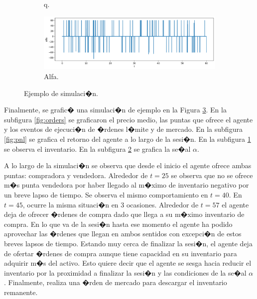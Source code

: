 \documentclass[12pt,a4paper,spanish]{article}%
\begin{document}
\begin{figure}[H]
\begin{subfigure}{0.8\textwidth}
	\caption{q.}
	\label{fig:q}
\end{subfigure}
\begin{subfigure}{0.8\textwidth}
	\centering
	\includegraphics[width=1\linewidth]{figuras/alpha_final}
	\caption{Alfa.}
	\label{fig:alpha}
\end{subfigure}
\caption{Ejemplo de simulaci�n.}
\label{fig:orders_pnl_q_alfa}
\end{figure}

Finalmente, se grafic� una simulaci�n de ejemplo en la Figura \ref{fig:orders_pnl_q_alfa}. En la subfigura \ref{fig:orders} se graficaron el precio medio, las puntas que ofrece el agente y los eventos de ejecuci�n de �rdenes l�mite y de mercado. En la subfigura \ref{fig:pnl} se grafica el retorno del agente a lo largo de la sesi�n. En la subfigura \ref{fig:q} se observa el inventario. En la subfigura \ref{fig:alpha} se grafica la se�al $\alpha$.

A lo largo de la simulaci�n se observa que desde el inicio el agente ofrece ambas puntas: compradora y vendedora. Alrededor de $t=25$ se observa que no se ofrece m�s punta vendedora por haber llegado al m�ximo de inventario negativo por un breve lapso de tiempo. Se observa el mismo comportamiento en $t=40$. En $t=45$, ocurre la misma situaci�n en 3 ocasiones. Alrededor de $t=57$ el agente deja de ofrecer �rdenes de compra dado que llega a su m�ximo inventario de compra. En lo que va de la sesi�n hasta ese momento el agente ha podido aprovechar las �rdenes que llegan en ambos sentidos con excepci�n de estos breves lapsos de tiempo. Estando muy cerca de finalizar la sesi�n, el agente deja de ofertar �rdenes de compra aunque tiene capacidad en su inventario para adquirir m�s del activo. Esto quiere decir que el agente se sesga hacia reducir el inventario por la proximidad a finalizar la sesi�n y las condiciones de la se�al $\alpha$. Finalmente, realiza una �rden de mercado para descargar el inventario remanente.

\end{document}
